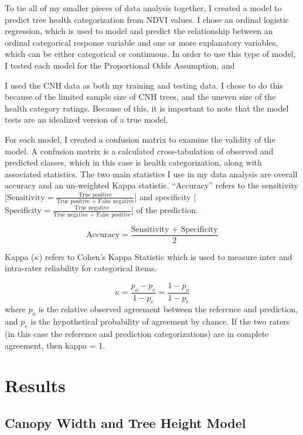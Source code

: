 \documentclass[12pt,twoside]{reedthesis}
\begin{document}
To tie all of my smaller pieces of data analysis together, I created a
model to predict tree health categorization from NDVI values. I chose an
ordinal logistic regression, which is used to model and predict the
relationship between an ordinal categorical response variable and one or
more explanatory variables, which can be either categorical or
continuous. In order to use this type of model, I tested each model for
the Proportional Odds Assumption, and

I used the CNH data as both my training and testing data. I chose to do
this because of the limited sample size of CNH trees, and the uneven
size of the health category ratings. Because of this, it is important to
note that the model tests are an idealized version of a true model.

For each model, I created a confusion matrix to examine the validity of
the model. A confusion matrix is a calculated cross-tabulation of
observed and predicted classes, which in this case is health
categorization, along with associated statistics. The two main
statistics I use in my data analysis are overall accuracy and an
un-weighted Kappa statistic. ``Accuracy'' refers to the sensitivity
{[}\(\textrm{Sensitivity}= \frac{\textrm{True positive}}{\textrm{True positive + False negative}}\){]}
and specificity
{[}\(\textrm{Specificity}= \frac{\textrm{True negative}}{\textrm{True negative + False positive}}\){]}
of the prediction.

\[
\textrm{Accuracy}= \frac{\textrm{Sensitivity + Specificity}}{2}
\]

Kappa (\(\kappa\)) refers to Cohen's Kappa Statistic which is used to
measure inter and intra-rater reliability for categorical items.

\[
\kappa = \frac{p_o - p_e}{1 - p_e} = \frac{1 - p_o}{1 - p_e}
\] where \(p_o\) is the relative observed agreement between the reference
and prediction, and \(p_e\) is the hypothetical probability of agreement
by chance. If the two raters (in this case the reference and prediction
categorizations) are in complete agreement, then kappa = 1.

\hypertarget{results}{%
\chapter{Results}\label{results}}

\hypertarget{canopy-width-and-tree-height-model-1}{%
\section{Canopy Width and Tree Height Model}\label{canopy-width-and-tree-height-model-1}}
\end{document}

